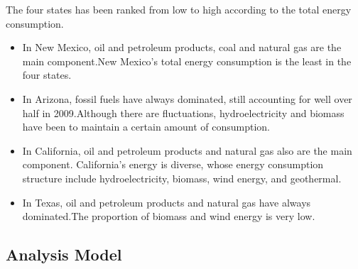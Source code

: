 The four states has been ranked from low to high according to the total energy consumption.
\begin{itemize}
	\item In New Mexico, oil and petroleum products, coal and natural gas are the main component.New Mexico's total energy consumption is the least in the four states.
	\item In Arizona, fossil fuels have always dominated, still accounting for well over half in 2009.Although there are fluctuations, hydroelectricity and biomass have been to maintain a certain amount of consumption.
	\item In California, oil and petroleum products and natural gas also are the main component. California's energy is diverse, whose energy consumption structure include hydroelectricity, biomass, wind energy, and geothermal.
	\item In Texas, oil and petroleum products and natural gas have always dominated.The proportion of biomass and wind energy is very low.
\end{itemize}
\subsection{Analysis Model}
